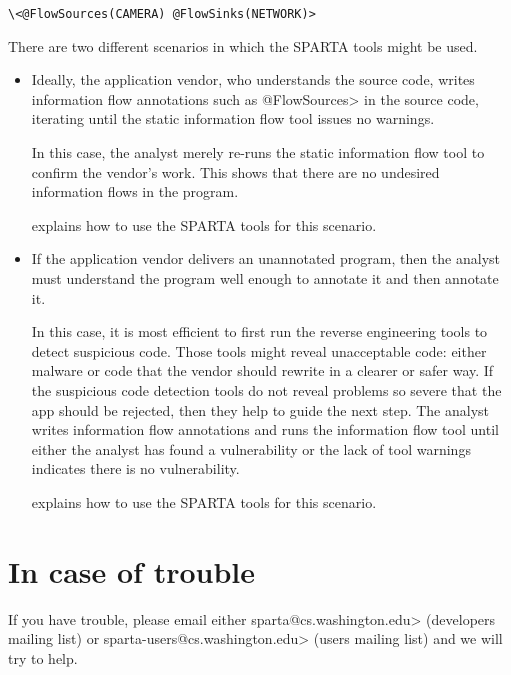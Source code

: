 \begin{Verbatim}
\<@FlowSources(CAMERA) @FlowSinks(NETWORK)>
\end{Verbatim}



There are two different scenarios in which the SPARTA tools might be used.
\begin{itemize}
\item
  Ideally, the application vendor, who understands the source code,
  writes information flow annotations such as \<@FlowSources> in the source
  code, iterating until the static information flow tool issues no warnings.

  In this case, the analyst merely re-runs the static information flow tool
  to confirm the vendor's work.  This shows that there are no undesired
  information flows in the program.

   explains how to use the SPARTA tools for
  this scenario.

\item
  If the application vendor delivers an unannotated program, then the
  analyst must understand the program well enough to annotate it and then
  annotate it.

  In this case, it is most efficient to first run the reverse engineering
  tools to detect suspicious code.  Those tools might reveal unacceptable
  code: either malware or code that the vendor
  should rewrite in a clearer or safer way.  If the suspicious code
  detection tools do not reveal problems so severe that the app should be
  rejected, then they help to guide the next step.   The analyst writes
  information flow annotations and runs the information
  flow tool until either the analyst has found a vulnerability or the lack
  of tool warnings indicates there is no vulnerability.

   explains how to use the SPARTA tools for
  this scenario.
\end{itemize}


\section{In case of trouble\label{sec:incaseoftrouble}}

\begin{sloppypar}
If you have trouble, please email either
\<sparta@cs.washington.edu>
(developers mailing list) or
\<sparta-users@cs.washington.edu> (users
mailing list) and we will try to help.
\end{sloppypar}





